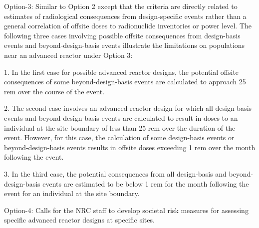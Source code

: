 \documentclass[10pt,a4paper]{article}
\begin{document}
Option-3: Similar to Option 2 except that the criteria are directly related to estimates of radiological consequences from design-specific events rather than a general correlation of offsite doses to radionuclide inventories or power level. 
The following three cases involving possible offsite consequences from design-basis events and beyond-design-basis events illustrate the limitations on populations near an advanced reactor under Option 3:

1. In the first case for possible advanced reactor designs, the potential offsite consequences of some beyond-design-basis events are calculated to approach 25 rem
over the course of the event.

2. The second case involves an advanced reactor design for which all design-basis events and beyond-design-basis events are calculated to result in doses to an individual at the site boundary of less than 25 rem over the duration of the event. However, for this case, the calculation of some design-basis events or beyond-design-basis events results in offsite doses exceeding 1 rem over the month following the event. 

3. In the third case, the potential consequences from all design-basis and beyond-design-basis events are estimated to be below 1 rem for the month following the event for an individual at the site boundary.

Option-4: Calls for the NRC staff to develop societal risk measures for assessing specific advanced reactor designs at specific sites. 
\end{document}
